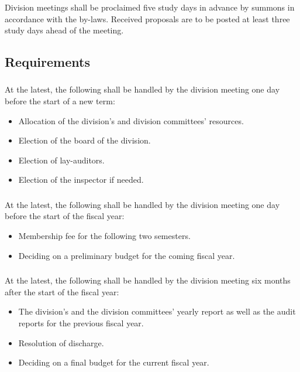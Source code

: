 \documentclass[a4paper]{dtek}
\begin{document}
\subsubsection{}
\label{sec:sektionsmote_utlysande}
Division meetings shall be proclaimed five study days in advance by summons in accordance with the by-laws. Received proposals are to be posted at least three study days ahead of the meeting. 


\subsection{Requirements}
\subsubsection{}
At the latest, the following shall be handled by the division meeting one day before the start of a new term: 

\begin{itemize}
    \item Allocation of the division's and division committees' resources.
    \item Election of the board of the division. 
    \item Election of lay-auditors.
    \item Election of the inspector if needed. 
\end{itemize}


\subsubsection{}
At the latest, the following shall be handled by the division meeting one day before the start of the fiscal year: 
\begin{itemize}
    \item Membership fee for the following two semesters.
    \item Deciding on a preliminary budget for the coming fiscal year. 
\end{itemize}


\subsubsection{}
At the latest, the following shall be handled by the division meeting six months after the start of the fiscal year: 

\begin{itemize}
    \item The division's and the division committees' yearly report as well as the audit reports for the previous fiscal year. 
    \item Resolution of discharge.
    \item Deciding on a final budget for the current fiscal year.
\end{itemize}
\end{document}
